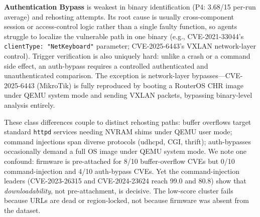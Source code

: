 \noindent\textbf{Authentication Bypass} is weakest in binary identification (P4: 3.68/15 per-run average) and rehosting attempts. Its root cause is usually cross-component session or access-control logic rather than a single faulty function, so agents struggle to localize the vulnerable path in one binary (e.g., CVE-2021-33044's \texttt{clientType: "NetKeyboard"} parameter; CVE-2025-6443's VXLAN network-layer control). Trigger verification is also uniquely hard: unlike a crash or a command side effect, an auth-bypass requires a controlled authenticated and unauthenticated comparison. The exception is network-layer bypasses---CVE-2025-6443 (MikroTik) is fully reproduced by booting a RouterOS CHR image under QEMU system mode and sending VXLAN packets, bypassing binary-level analysis entirely.

These class differences couple to distinct rehosting paths: buffer overflows target standard \texttt{httpd} services needing NVRAM shims under QEMU user mode; command injections span diverse protocols (udhcpd, CGI, thrift); auth-bypasses occasionally demand a full OS image under QEMU system mode. We note one confound: firmware is pre-attached for 8/10 buffer-overflow CVEs but 0/10 command-injection and 4/10 auth-bypass CVEs. Yet the command-injection leaders (CVE-2023-26315 and CVE-2024-23624 reach 99.0 and 80.8) show that \emph{downloadability}, not pre-attachment, is decisive. The low-score cluster fails because URLs are dead or region-locked, not because firmware was absent from the dataset.


